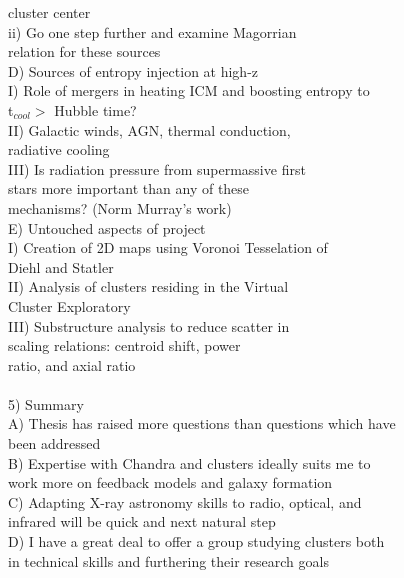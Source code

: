 \documentclass[12pt]{article}
\begin{document}
\begin{tabbing}
\>\>\>\>		     cluster center\\
\>\>\>\>		ii)  Go one step further and examine Magorrian\\
\>\>\>\>		     relation for these sources\\
\>	D) Sources of entropy injection at high-z\\
\>\>		I)   Role of mergers in heating ICM and boosting entropy to\\
\>\>\>		     t$_{cool} >$ Hubble time?\\
\>\>		II)  Galactic winds, AGN, thermal conduction,\\
\>\>\>		     radiative cooling\\
\>\>		III) Is radiation pressure from supermassive first\\
\>\>\>		     stars more important than any of these\\
\>\>\>		     mechanisms? (Norm Murray's work)\\
\>	E) Untouched aspects of project\\
\>\>		I)   Creation of 2D maps using Voronoi Tesselation of\\
\>\>\>		     Diehl and Statler\\
\>\>		II)  Analysis of clusters residing in the Virtual\\
\>\>\>		     Cluster Exploratory\\
\>\>		III) Substructure analysis to reduce scatter in\\
\>\>\>		     scaling relations: centroid shift, power\\
\>\>\>		     ratio, and axial ratio\\
\\
5) Summary\\
\>	A) Thesis has raised more questions than questions which have\\
\>\>	   been addressed\\
\>	B) Expertise with Chandra and clusters ideally suits me to\\
\>\>	   work more on feedback models and galaxy formation\\
\>	C) Adapting X-ray astronomy skills to radio, optical, and\\
\>\>	   infrared will be quick and next natural step\\
\>	D) I have a great deal to offer a group studying clusters both\\
\>\>	   in technical skills and furthering their research goals\\
\\

\end{tabbing}
\end{document}
